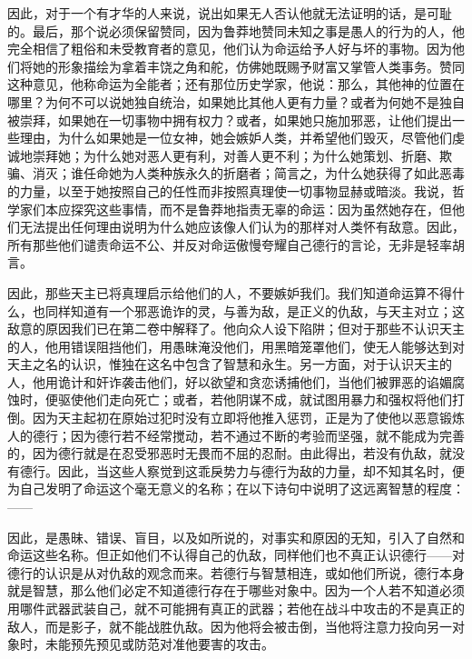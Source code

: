 因此，对于一个有才华的人来说，说出如果无人否认他就无法证明的话，是可耻的。最后，那个说必须保留赞同，因为鲁莽地赞同未知之事是愚人的行为的人，他完全相信了粗俗和未受教育者的意见，他们认为命运给予人好与坏的事物。因为他们将她的形象描绘为拿着丰饶之角和舵，仿佛她既赐予财富又掌管人类事务。赞同这种意见，他称命运为全能者；还有那位历史学家，他说：那么，其他神的位置在哪里？为何不可以说她独自统治，如果她比其他人更有力量？或者为何她不是独自被崇拜，如果她在一切事物中拥有权力？或者，如果她只施加邪恶，让他们提出一些理由，为什么如果她是一位女神，她会嫉妒人类，并希望他们毁灭，尽管他们虔诚地崇拜她；为什么她对恶人更有利，对善人更不利；为什么她策划、折磨、欺骗、消灭；谁任命她为人类种族永久的折磨者；简言之，为什么她获得了如此恶毒的力量，以至于她按照自己的任性而非按照真理使一切事物显赫或暗淡。我说，哲学家们本应探究这些事情，而不是鲁莽地指责无辜的命运：因为虽然她存在，但他们无法提出任何理由说明为什么她应该像人们认为的那样对人类怀有敌意。因此，所有那些他们谴责命运不公、并反对命运傲慢夸耀自己德行的言论，无非是轻率胡言。\par

因此，那些天主已将真理启示给他们的人，不要嫉妒我们。我们知道命运算不得什么，也同样知道有一个邪恶诡诈的灵，与善为敌，是正义的仇敌，与天主对立；这敌意的原因我们已在第二卷中解释了。他向众人设下陷阱；但对于那些不认识天主的人，他用错误阻挡他们，用愚昧淹没他们，用黑暗笼罩他们，使无人能够达到对天主之名的认识，惟独在这名中包含了智慧和永生。另一方面，对于认识天主的人，他用诡计和奸诈袭击他们，好以欲望和贪恋诱捕他们，当他们被罪恶的谄媚腐蚀时，便驱使他们走向死亡；或者，若他阴谋不成，就试图用暴力和强权将他们打倒。因为天主起初在原始过犯时没有立即将他推入惩罚，正是为了使他以恶意锻炼人的德行；因为德行若不经常搅动，若不通过不断的考验而坚强，就不能成为完善的，因为德行就是在忍受邪恶时无畏而不屈的忍耐。由此得出，若没有仇敌，就没有德行。因此，当这些人察觉到这乖戾势力与德行为敌的力量，却不知其名时，便为自己发明了命运这个毫无意义的名称；在以下诗句中说明了这远离智慧的程度：——\par

\par

因此，是愚昧、错误、盲目，以及如所说的，对事实和原因的无知，引入了自然和命运这些名称。但正如他们不认得自己的仇敌，同样他们也不真正认识德行——对德行的认识是从对仇敌的观念而来。若德行与智慧相连，或如他们所说，德行本身就是智慧，那么他们必定不知道德行存在于哪些对象中。因为一个人若不知道必须用哪件武器武装自己，就不可能拥有真正的武器；若他在战斗中攻击的不是真正的敌人，而是影子，就不能战胜仇敌。因为他将会被击倒，当他将注意力投向另一对象时，未能预先预见或防范对准他要害的攻击。\par

